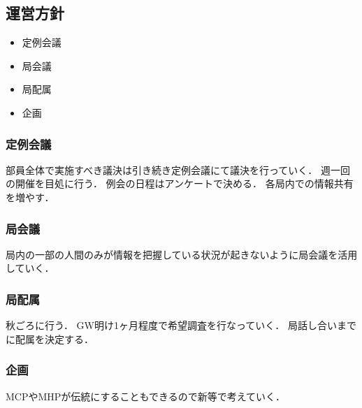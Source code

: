 \subsection*{運営方針}


\begin{itemize}
    \item 定例会議
    \item 局会議
    \item 局配属
    \item 企画
    
  \end{itemize}
  
\subsubsection{定例会議}
部員全体で実施すべき議決は引き続き定例会議にて議決を行っていく．
週一回の開催を目処に行う．
例会の日程はアンケートで決める．
各局内での情報共有を増やす．

\subsubsection{局会議}
局内の一部の人間のみが情報を把握している状況が起きないように局会議を活用していく．

\subsubsection{局配属}
秋ごろに行う．
GW明け1ヶ月程度で希望調査を行なっていく．
局話し合いまでに配属を決定する．

\subsubsection{企画}
MCPやMHPが伝統にすることもできるので新\secondGrade{}等で考えていく．


